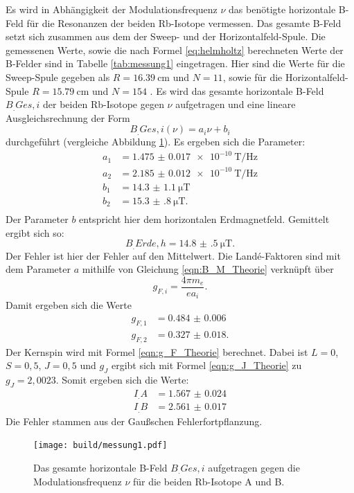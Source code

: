 Es wird in Abhängigkeit der Modulationsfrequenz $\nu$ das benötigte horizontale B-Feld für die Resonanzen der beiden Rb-Isotope vermessen. Das gesamte B-Feld setzt sich zusammen aus dem der Sweep- und der Horizontalfeld-Spule. Die gemessenen Werte, sowie die nach Formel \ref{eq:helmholtz} berechneten Werte der B-Felder sind in Tabelle \ref{tab:messung1} eingetragen. Hier sind die Werte für die Sweep-Spule gegeben als $R=\SI{16.39}{\centi\metre}$ und $N=11$, sowie für die Horizontalfeld-Spule $R=\SI{15.79}{\centi\metre}$ und $N=154$ \cite{V21}.
Es wird das gesamte horizontale B-Feld $B_.{Ges,i}$ der beiden Rb-Isotope gegen $\nu$ aufgetragen und eine lineare Ausgleichsrechnung der Form
\[
B_.{Ges,i}(\nu) = a_i\nu + b_i
\]
durchgeführt (vergleiche Abbildung \ref{fig:messung1}).
Es ergeben sich die Parameter:
\begin{align*}
a_1 &= \SI{1.475(17)e-10}{\tesla\per\hertz}\\
a_2 &= \SI{2.185(12)e-10}{\tesla\per\hertz}\\
b_1 &= \SI{14.3(11)}{\micro\tesla}\\
b_2 &= \SI{15.3(8)}{\micro\tesla}\text{.}\\
\end{align*}
Der Parameter $b$ entspricht hier dem horizontalen Erdmagnetfeld. Gemittelt ergibt sich so:
\[
B_.{Erde,h} = \SI{14.8(5)}{\micro\tesla}\text{.}
\]
Der Fehler ist hier der Fehler auf den Mittelwert.
Die Landé-Faktoren sind mit dem Parameter $a$ mithilfe von Gleichung \eqref{eqn:B_M_Theorie} verknüpft über
\begin{equation*}
g_{F,i}=\frac{4\pi m_e}{e a_i} \text{.}
\end{equation*}
Damit ergeben sich die Werte
\begin{align*}
g_{F,1} &= \num{0.484(6)}\\
g_{F,2} &= \num{0.327(18)}\text{.}
\end{align*}
Der Kernspin wird mit Formel \eqref{eqn:g_F_Theorie} berechnet. Dabei ist $L=0$, $S=0,5$, $J=0,5$ und $g_J$ ergibt sich mit Formel \eqref{eqn:g_J_Theorie} zu $g_J=2,0023$. 
Somit ergeben sich die Werte:
\begin{align*}
I_.A &= \num{1.567(24)}\\
I_.B &= \num{2.561(17)}
\end{align*}
Die Fehler stammen aus der Gaußschen Fehlerfortpflanzung.
\begin{figure}
	\centering
	\texttt{[image: build/messung1.pdf]}
	\caption{Das gesamte horizontale B-Feld $B_.{Ges,i}$ aufgetragen gegen die Modulationsfrequenz $\nu$ für die beiden Rb-Isotope A und B.}
	\label{fig:messung1}
\end{figure}

